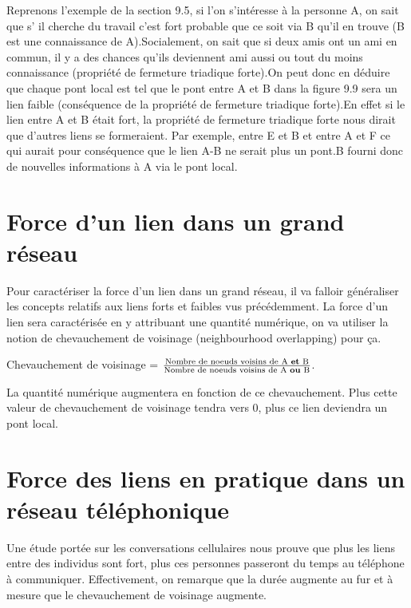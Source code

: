 Reprenons l'exemple de la section 9.5, si l'on s'intéresse à la personne A, on sait que s' il cherche du travail c'est fort probable que ce soit via B qu'il en trouve (B est une connaissance de A).Socialement, on sait que si deux amis ont un ami en commun, il y a des chances qu'ils deviennent ami aussi ou tout du moins connaissance (propriété de fermeture triadique forte).On peut donc en déduire que chaque pont local est tel que le pont entre A et B dans la figure 9.9 sera un lien faible (conséquence de la propriété de fermeture triadique forte).En effet si le lien entre A et B était fort, la propriété de fermeture triadique forte nous dirait que d'autres liens se formeraient. Par exemple, entre E et B et entre A et F ce qui aurait pour conséquence que le lien A-B ne serait plus un pont.B fourni donc de nouvelles informations à A via le pont local.
\newline
\section{Force d'un lien dans un grand réseau}
Pour caractériser la force d'un lien dans un grand réseau, il va falloir généraliser les concepts relatifs aux liens forts et faibles vus précédemment.
La force d'un lien sera caractérisée en y attribuant une quantité numérique, on va utiliser la notion de chevauchement de voisinage (neighbourhood overlapping) pour ça.\\
\begin{center}
Chevauchement de voisinage = $\frac{\text{Nombre de noeuds voisins de A \textbf{et} B}}{\text{Nombre de noeuds voisins de A \textbf{ou} B}}$.\\
\end{center}
La quantité numérique augmentera en fonction de ce chevauchement. Plus cette valeur de chevauchement de voisinage tendra vers 0, plus ce lien deviendra un pont local.
\newline
\section{Force des liens en pratique dans un réseau téléphonique}
Une étude portée sur les conversations cellulaires nous prouve que plus les liens entre des individus sont fort, plus ces personnes passeront du temps au téléphone à communiquer. Effectivement, on remarque que la durée augmente au fur et à mesure que le chevauchement de voisinage augmente.
\newline
